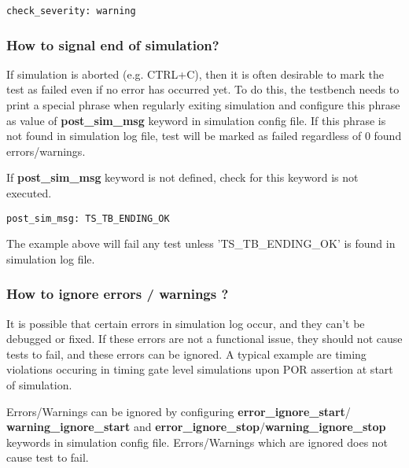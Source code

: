 \documentclass{tropic_design_spec}
\begin{document}
\begin{lstlisting}
check_severity: warning
\end{lstlisting}


\subsubsection{How to signal end of simulation?}
\label{sec:how-to-signal-end-of-simulation}

If simulation is aborted (e.g. CTRL+C), then it is often desirable to mark the test
as failed even if no error has occurred yet. To do this, the testbench needs to print
a special phrase when regularly exiting simulation and configure this phrase as value
of \textbf{post_sim_msg} keyword in simulation config file. If this phrase is not found
in simulation log file, test will be marked as failed regardless of 0 found errors/warnings.

If \textbf{post_sim_msg} keyword is not defined, check for this keyword is not executed.

\begin{lstlisting}
post_sim_msg: TS_TB_ENDING_OK
\end{lstlisting}

The example above will fail any test unless 'TS_TB_ENDING_OK' is found in simulation
log file.


\subsubsection{How to ignore errors / warnings ?}
\label{sec:how-to-ignore-errors-warnigns}

It is possible that certain errors in simulation log occur, and they can't be debugged or
fixed. If these errors are not a functional issue, they should not cause tests to fail,
and these errors can be ignored. A typical example are timing violations occuring in
timing gate level simulations upon POR assertion at start of simulation.

Errors/Warnings can be ignored by configuring \textbf{error_ignore_start}/
\textbf{warning_ignore_start} and \textbf{error_ignore_stop}/\textbf{warning_ignore_stop}
keywords in simulation config file. Errors/Warnings which are ignored does not cause
test to fail.
\end{document}
